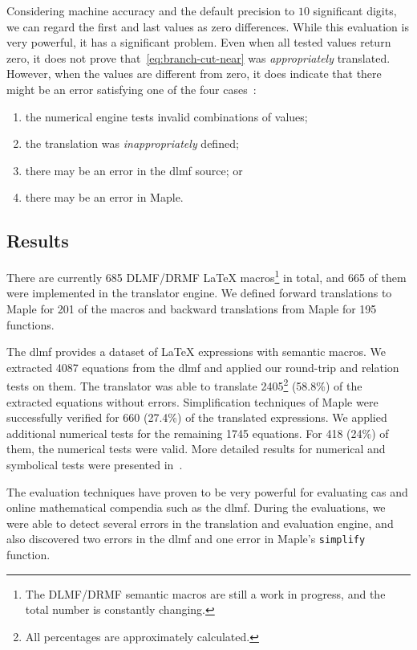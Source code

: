 \documentclass[a4paper,11pt]{article}
\newcommand{\DLMF}{DLMF}
\newcommand{\DRMF}{DRMF}
\newcommand{\Maple}{Maple}
\newcommand{\Macro}{\DLMF/\DRMF{} \LaTeX{} macro}
\theoremstyle{defTheoStyle}
\theoremstyle{defExampStyle}
\begin{document}
Considering machine accuracy and the default precision to $10$ significant digits, we can regard the first and last values as zero differences. While this evaluation is very powerful, it has a significant problem. Even when all tested values return zero, it does not prove that~\eqref{eq:branch-cut-near} was {\it appropriately} translated. However, when the values are different from zero, it does indicate that there might be an error satisfying one of the four cases~\parencite{NumericalTests:Paper}:
\begin{enumerate}
\item the numerical engine tests invalid combinations of values;
\item the translation was {\it inappropriately} defined;
\item there may be an error in the \gls*{dlmf} source; or
\item there may be an error in \Maple.
\end{enumerate}

\subsection{Results}\label{sec:test-summary}
There are currently 685 \Macro{}s\footnote{The DLMF/DRMF semantic macros are still a work in progress, and the total number is constantly changing.} in total, and 665 of them were implemented in the translator engine. We defined forward translations to \Maple{} for 201 of the macros and backward translations from \Maple{} for 195 functions. 

The \gls*{dlmf} provides a dataset of \LaTeX{} expressions with semantic macros. We extracted 4087 equations from the \gls*{dlmf} and applied our round-trip and relation tests on them. The translator was able to translate 2405\footnote{All percentages are approximately calculated.} (58.8\%) of the extracted equations without errors. 
Simplification techniques of \Maple{} were successfully verified for 660 (27.4\%) of the translated expressions. 
We applied additional numerical tests for the remaining 1745 equations. For 418 (24\%) of them, the numerical tests were valid. More detailed results for numerical and symbolical tests were presented in~\parencite{NumericalTests:Paper}.


The evaluation techniques have proven to be very powerful for evaluating \gls*{cas} and online mathematical compendia such as the \gls*{dlmf}. During the evaluations, we were able to detect several errors in the translation and evaluation engine, and also discovered two errors in the \gls*{dlmf} and one error in \Maple's \texttt{simplify} function.
\end{document}
